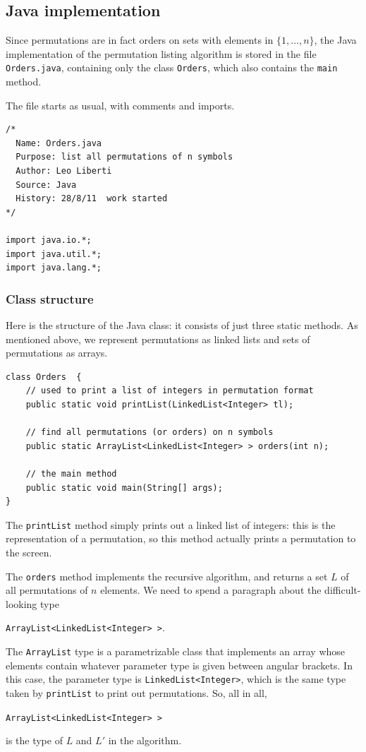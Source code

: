 \documentclass[a4paper]{book}
\theoremstyle{changebreak}                %
\begin{document}
\subsection{Java implementation}
Since permutations are in fact orders on sets with
elements in $\{1,\ldots,n\}$, the Java implementation of
the permutation listing algorithm is stored in the
file {\tt Orders.java}, containing only the class {\tt Orders}, which
also contains the {\tt main} method.

The file starts as usual, with comments and
imports.
\begin{verbatim}
/*
  Name: Orders.java
  Purpose: list all permutations of n symbols
  Author: Leo Liberti
  Source: Java
  History: 28/8/11  work started
*/

import java.io.*;
import java.util.*;
import java.lang.*;
\end{verbatim}

\subsubsection{Class structure}
Here is the structure of the Java class: it consists of just three
static methods. As mentioned above, we represent
permutations as linked lists and sets of
permutations as arrays.
\begin{verbatim}
class Orders  {
    // used to print a list of integers in permutation format
    public static void printList(LinkedList<Integer> tl);

    // find all permutations (or orders) on n symbols 
    public static ArrayList<LinkedList<Integer> > orders(int n);

    // the main method
    public static void main(String[] args);
}
\end{verbatim}

The {\tt printList} method simply prints out a linked
list of integers: this is the representation of a
permutation, so this method actually prints a permutation to the
screen. 

The {\tt orders} method implements the recursive algorithm, and
returns a set $L$ of all permutations of $n$ elements. We need to
spend a paragraph about the difficult-looking type 
\begin{center}
{\tt ArrayList<LinkedList<Integer> >}. 
\end{center}
The {\tt ArrayList} type is a parametrizable
class that implements an array whose elements contain whatever
parameter type is given between angular brackets. In this case, the
parameter type is {\tt LinkedList<Integer>},
which is the same type taken by {\tt printList} to print out
permutations. So, all in all, 
\begin{center}
{\tt ArrayList<LinkedList<Integer> >} 
\end{center}
is the type of $L$ and $L'$ in the algorithm.
\end{document}
